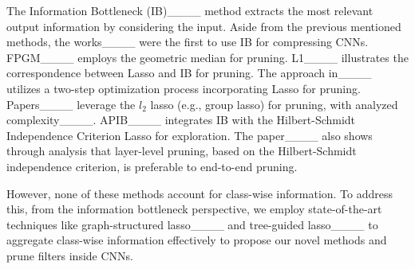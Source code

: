 The Information Bottleneck (IB)____ method extracts the most relevant output information by considering the input. Aside from the previous mentioned methods, the works____ were the first to use IB for compressing CNNs. FPGM____ employs the geometric median for pruning. L1____ illustrates the correspondence between Lasso and IB for pruning. The approach in____ utilizes a two-step optimization process incorporating Lasso for pruning. Papers____ leverage the $l_2$ lasso (e.g., group lasso) for pruning, with analyzed complexity____. APIB____ integrates IB with the Hilbert-Schmidt Independence Criterion Lasso for exploration. The paper____ also shows through analysis that layer-level pruning, based on the Hilbert-Schmidt independence criterion, is preferable to end-to-end pruning.

However, none of these methods account for class-wise information. To address this, from the information bottleneck perspective, we employ state-of-the-art techniques like graph-structured lasso____ and tree-guided lasso____ to aggregate class-wise information effectively to propose our novel methods and prune filters inside CNNs.
